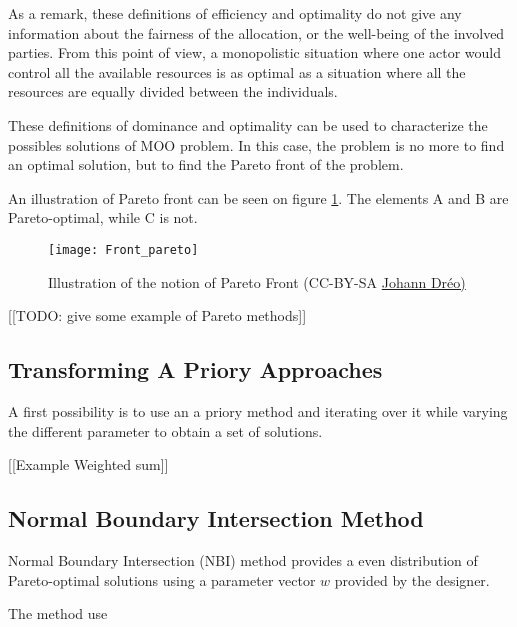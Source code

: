 As a remark, these definitions of efficiency and optimality do not give any information about the fairness of the allocation, or the well-being of the involved parties. From this point of view, a monopolistic situation where one actor would control all the available resources is as optimal as a situation where all the resources are equally divided between the individuals.

These definitions of dominance and optimality can be used to characterize the possibles solutions of MOO problem. In this case, the problem is no more to find an optimal solution, but to find the Pareto front of the problem.

An illustration of Pareto front can be seen on figure \ref{Front_Pareto}. The elements A and B are Pareto-optimal, while C is not.


\begin{figure}
\centering
\texttt{[image: Front\_pareto]}\\
\caption{Illustration of the notion of Pareto Front (CC-BY-SA \href{http://en.wikipedia.org/wiki/File:Front_pareto.svg}{Johann Dréo)}}

\label{Front_Pareto}
\end{figure}

[[TODO: give some example of Pareto methods]]

\subsection{Transforming A Priory Approaches}

A first possibility is to use an a priory method and iterating over it while varying the different parameter to obtain a set of solutions.

[[Example Weighted sum]]

\subsection{Normal Boundary Intersection Method}

Normal Boundary Intersection (NBI)\cite{S1052623496307510} method provides a even distribution of Pareto-optimal solutions using a parameter vector $w$ provided by the designer.

The method use 

